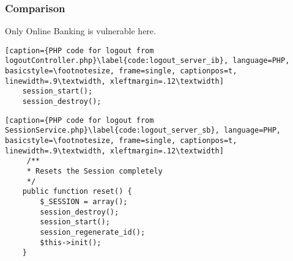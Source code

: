 \subsubsection{Comparison}
Only Online Banking is vulnerable here.

\begin{lstlisting}[caption={PHP code for logout from logoutController.php}\label{code:logout_server_ib}, language=PHP, basicstyle=\footnotesize, frame=single, captionpos=t, linewidth=.9\textwidth, xleftmargin=.12\textwidth]
    session_start();
    session_destroy();
\end{lstlisting}

\begin{lstlisting}[caption={PHP code for logout from SessionService.php}\label{code:logout_server_sb}, language=PHP, basicstyle=\footnotesize, frame=single, captionpos=t, linewidth=.9\textwidth, xleftmargin=.12\textwidth]
     /**
     * Resets the Session completely
     */
    public function reset() {
        $_SESSION = array();
        session_destroy();
        session_start();
        session_regenerate_id();
        $this->init();
    }
\end{lstlisting}
\clearpage